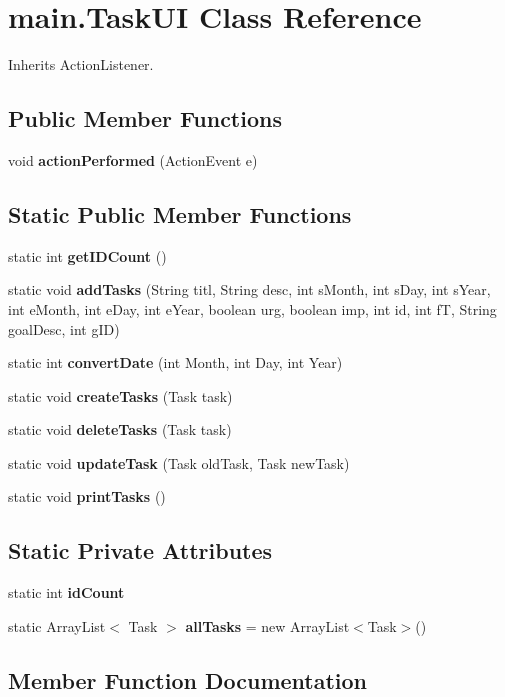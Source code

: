 \section{main.\+Task\+UI Class Reference}
\label{classmain_1_1_task_u_i}


Inherits Action\+Listener.

\subsection*{Public Member Functions}
\begin{DoxyCompactItemize}
\item 
void \textbf{ action\+Performed} (Action\+Event e)
\end{DoxyCompactItemize}
\subsection*{Static Public Member Functions}
\begin{DoxyCompactItemize}
\item 
static int \textbf{ get\+I\+D\+Count} ()
\item 
static void \textbf{ add\+Tasks} (String titl, String desc, int s\+Month, int s\+Day, int s\+Year, int e\+Month, int e\+Day, int e\+Year, boolean urg, boolean imp, int id, int fT, String goal\+Desc, int g\+ID)
\item 
static int \textbf{ convert\+Date} (int Month, int Day, int Year)
\item 
static void \textbf{ create\+Tasks} (Task task)
\item 
static void \textbf{ delete\+Tasks} (Task task)
\item 
static void \textbf{ update\+Task} (Task old\+Task, Task new\+Task)
\item 
static void \textbf{ print\+Tasks} ()
\end{DoxyCompactItemize}
\subsection*{Static Private Attributes}
\begin{DoxyCompactItemize}
\item 
static int \textbf{ id\+Count}
\item 
static Array\+List$<$ Task $>$ \textbf{ all\+Tasks} = new Array\+List$<$Task$>$()
\end{DoxyCompactItemize}


\subsection{Member Function Documentation}
\mbox{\label{classmain_1_1_task_u_i_ab9681721a6fd3d4cb8169c5633fed8c4}} 
